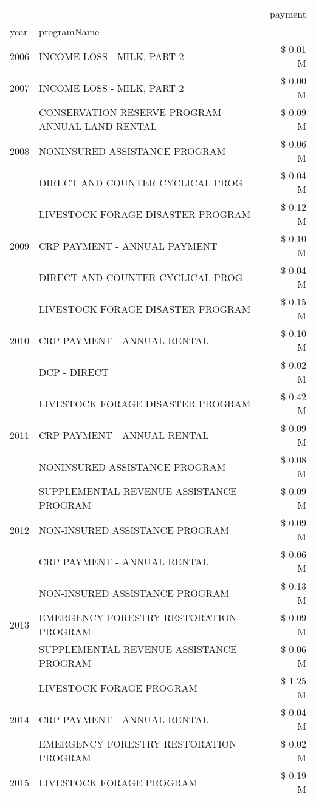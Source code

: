 \begin{tabular}{llr}
\toprule
 &  & payment \\
year & programName &  \\
\midrule
2006 & INCOME LOSS - MILK, PART 2 & \$ 0.01 M \\
\cline{1-3}
2007 & INCOME LOSS - MILK, PART 2 & \$ 0.00 M \\
\cline{1-3}
\multirow[t]{3}{*}{2008} & CONSERVATION RESERVE PROGRAM - ANNUAL LAND RENTAL & \$ 0.09 M \\
 & NONINSURED ASSISTANCE PROGRAM & \$ 0.06 M \\
 & DIRECT AND COUNTER CYCLICAL PROG & \$ 0.04 M \\
\cline{1-3}
\multirow[t]{3}{*}{2009} & LIVESTOCK FORAGE DISASTER  PROGRAM & \$ 0.12 M \\
 & CRP PAYMENT - ANNUAL PAYMENT & \$ 0.10 M \\
 & DIRECT AND COUNTER CYCLICAL PROG & \$ 0.04 M \\
\cline{1-3}
\multirow[t]{3}{*}{2010} & LIVESTOCK FORAGE DISASTER PROGRAM & \$ 0.15 M \\
 & CRP PAYMENT - ANNUAL RENTAL & \$ 0.10 M \\
 & DCP - DIRECT & \$ 0.02 M \\
\cline{1-3}
\multirow[t]{3}{*}{2011} & LIVESTOCK FORAGE DISASTER PROGRAM & \$ 0.42 M \\
 & CRP PAYMENT - ANNUAL RENTAL & \$ 0.09 M \\
 & NONINSURED ASSISTANCE PROGRAM & \$ 0.08 M \\
\cline{1-3}
\multirow[t]{3}{*}{2012} & SUPPLEMENTAL REVENUE ASSISTANCE PROGRAM & \$ 0.09 M \\
 & NON-INSURED ASSISTANCE PROGRAM & \$ 0.09 M \\
 & CRP PAYMENT - ANNUAL RENTAL & \$ 0.06 M \\
\cline{1-3}
\multirow[t]{3}{*}{2013} & NON-INSURED ASSISTANCE PROGRAM & \$ 0.13 M \\
 & EMERGENCY FORESTRY RESTORATION PROGRAM & \$ 0.09 M \\
 & SUPPLEMENTAL REVENUE ASSISTANCE PROGRAM & \$ 0.06 M \\
\cline{1-3}
\multirow[t]{3}{*}{2014} & LIVESTOCK FORAGE PROGRAM & \$ 1.25 M \\
 & CRP PAYMENT - ANNUAL RENTAL & \$ 0.04 M \\
 & EMERGENCY FORESTRY RESTORATION PROGRAM & \$ 0.02 M \\
\cline{1-3}
\multirow[t]{3}{*}{2015} & LIVESTOCK FORAGE PROGRAM & \$ 0.19 M \\

\end{tabular}
